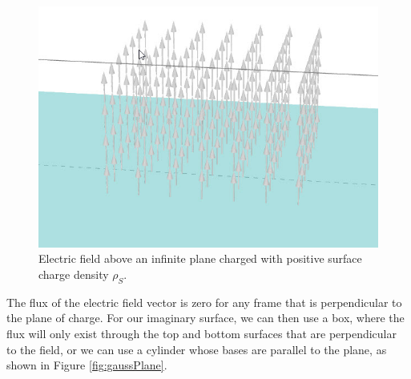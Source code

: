 \documentclass{ximera}
\begin{document}
\begin{figure}[htbp]
\begin{center}
\includegraphics[scale=0.8]{../jpg/3DFieldInfinitePlane.jpg}
\end{center}
\caption{Electric field above an infinite plane charged with positive surface charge density $\rho_S$.}
\label{fig:3DFieldInfinitePlane}
\end{figure}


The flux of the electric field vector is zero for any frame that is perpendicular to the plane of charge. For our imaginary surface, we can then use a box, where the flux will only exist through the top and bottom surfaces that are perpendicular to the field, or we can use a cylinder whose bases are parallel to the plane, as shown in Figure \ref{fig:gaussPlane}. 
\end{document}
